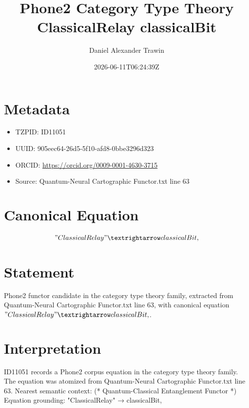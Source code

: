\documentclass[11pt]{article}
\title{Phone2 Category Type Theory ClassicalRelay classicalBit}
\author{Daniel Alexander Trawin}
\date{2026-06-11T06:24:39Z}
\begin{document}
\maketitle
\section*{Metadata}
\begin{itemize}
\item TZPID: ID11051
\item UUID: 905eec64-26d5-5f10-afd8-0bbe3296d323
\item ORCID: \url{https://orcid.org/0009-0001-4630-3715}
\item Source: Quantum-Neural Cartographic Functor.txt line 63
\end{itemize}
\section*{Canonical Equation}
\[
"ClassicalRelay" → classicalBit,
\]
\section*{Statement}
Phone2 functor candidate in the category type theory family, extracted from Quantum-Neural Cartographic Functor.txt line 63, with canonical equation $"ClassicalRelay" → classicalBit,$.
\section*{Interpretation}
ID11051 records a Phone2 corpus equation in the category type theory family. The equation was atomized from Quantum-Neural Cartographic Functor.txt line 63. Nearest semantic context: (* Quantum-Classical Entanglement Functor *) Equation grounding: "ClassicalRelay" → classicalBit,
\end{document}
